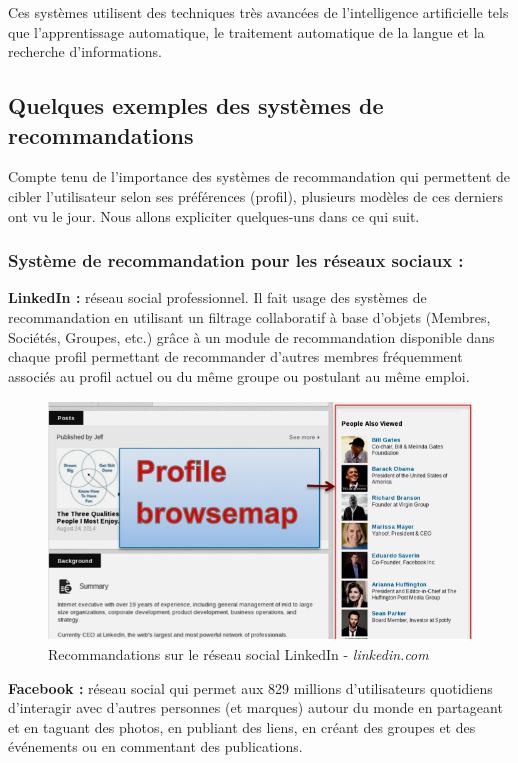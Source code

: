Ces systèmes utilisent des techniques très avancées de l'intelligence artificielle tels que l'apprentissage automatique, le traitement automatique de la langue et la recherche d'informations. 

\subsection{Quelques exemples des systèmes de recommandations}
Compte tenu de l'importance des systèmes de recommandation qui permettent de cibler l'utilisateur selon ses préférences (profil), plusieurs modèles de ces derniers ont vu le jour. Nous allons expliciter quelques-uns dans ce qui suit.

\subsubsection{Système de recommandation pour les réseaux sociaux :}
\textbf{LinkedIn :} réseau social professionnel. Il fait usage des systèmes de recommandation en utilisant un filtrage collaboratif à base d'objets (Membres, Sociétés, Groupes, etc.) grâce à un module de recommandation disponible dans chaque profil permettant de recommander d'autres membres fréquemment associés au profil actuel ou du même groupe ou postulant au même emploi.
\begin{figure}[H]
    \centering
    \includegraphics[height=180pt,width=350pt]{img/chapter1/linkedin.png}
    \caption{Recommandations sur le réseau social LinkedIn - \emph{linkedin.com}}
\end{figure}

\textbf{Facebook :} réseau social qui permet aux 829 millions d'utilisateurs quotidiens \cite{userFacebook} d'interagir avec d'autres personnes (et marques) autour du monde en partageant et en taguant des photos, en publiant des liens, en créant des groupes et des événements ou en commentant des publications. 

